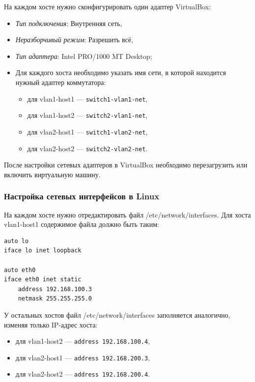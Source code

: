\documentclass{article}
\begin{document}
На каждом хосте нужно сконфигурировать один адаптер VirtualBox:
\begin{itemize}
    \itemsep0em 
    \item \emph{Тип подключения}: Внутренняя сеть,
    \item \emph{Неразборчивый режим}: Разрешить всё, 
    \item \emph{Тип адаптера}: Intel PRO/1000 MT Desktop;
    \item Для каждого хоста необходимо указать имя сети, в которой находится нужный адаптер коммутатора:
    \begin{itemize}
        \itemsep0em 
        \item для vlan1-host1 --- \verb|switch1-vlan1-net|,
        \item для vlan1-host2 --- \verb|switch2-vlan1-net|,
        \item для vlan2-host1 --- \verb|switch1-vlan2-net|,
        \item для vlan2-host2 --- \verb|switch2-vlan2-net|.
    \end{itemize}
\end{itemize}

После настройки сетевых адаптеров в VirtualBox необходимо перезагрузить или включить виртуальную машину. 

\subsubsection{Настройка сетевых интерфейсов в Linux}

На каждом хосте нужно отредактировать файл /etc/network/interfaces. Для хоста vlan1-host1 содержимое файла должно быть таким:

\begin{lstlisting}
auto lo
iface lo inet loopback

auto eth0
iface eth0 inet static
    address 192.168.100.3
    netmask 255.255.255.0
\end{lstlisting}

У остальных хостов файл /etc/network/interfaces заполняется аналогично, изменяя только IP-адрес хоста:
    \begin{itemize}
        \itemsep0em 
        \item для vlan1-host2 --- \verb|address 192.168.100.4|,
        \item для vlan2-host1 --- \verb|address 192.168.200.3|,
        \item для vlan2-host2 --- \verb|address 192.168.200.4|.
    \end{itemize}
\end{document}
